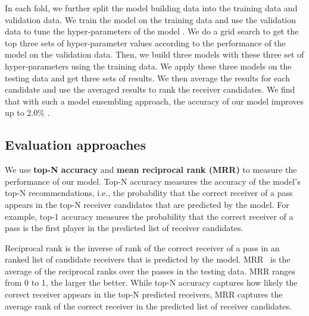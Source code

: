 In each fold, we further split the model building data into the training data and validation data.
We train the model on the training data and use the validation data to tune the hyper-parameters of the model .
We do a grid search to get the top three sets of hyper-parameter values according to the performance of the model on the validation data.
Then, we build three models with these three set of hyper-parameters using the training data. 
We apply these three models on the testing data and get three sets of results.
We then average the results for each candidate and use the averaged results to rank the receiver candidates. We find that with such a model ensembling approach, the accuracy of our model improves up to 2.0\% .




\subsection{Evaluation approaches}

We use \textbf{top-N accuracy} and \textbf{mean reciprocal rank (MRR)} to measure the performance of our model.
Top-N accuracy measures the accuracy of the model's top-N recommendations, i.e., the probability that the correct receiver of a pass appears in the top-N receiver candidates that are predicted by the model.
For example, top-1 accuracy measures the probability that the correct receiver of a pass is the first player in the predicted list of receiver candidates.

Reciprocal rank is the inverse of rank of the correct receiver of a pass in an ranked list of candidate receivers that is predicted by the model.
MRR~\cite{Craswell2009} is the average of the reciprocal ranks over the passes in the testing data. MRR ranges from 0 to 1, the larger the better. 
While top-N accuracy captures how likely the correct receiver appears in the top-N predicted receivers, 
MRR captures the average rank of the correct receiver in the predicted list of receiver candidates.
 
